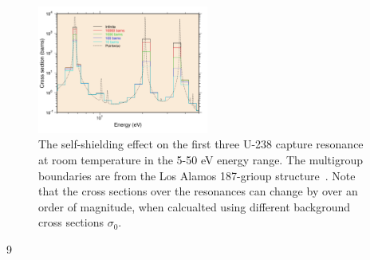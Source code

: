 \documentclass[10pt]{article}
\begin{document}
\begin{figure}[H]
  \begin{center}
\includegraphics[width=0.5\textwidth]{njoyGroupr}
  \caption{The self-shielding effect on the first three U-238 capture resonance at room temperature in the 5-50 eV energy range. The multigroup boundaries are from the Los Alamos 187-grioup structure~\cite{njoy16}. Note that the cross sections over the resonances can change by over an order of magnitude, when calcualted using different background cross sections $\sigma_0$.}
  \label{fig:njoyDil}
  \end{center}
\end{figure}
9
\end{document}
